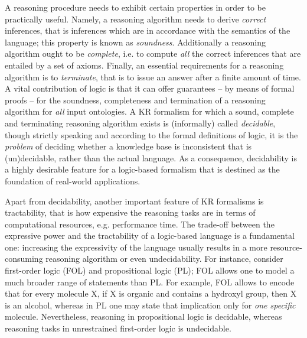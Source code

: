 \documentclass[10pt]{bmc_article}
\newenvironment{bmcformat}{\baselineskip20pt\sloppy\setboolean{publ}{false}}{\baselineskip20pt\sloppy}
\begin{document}
\begin{bmcformat}
A reasoning procedure needs to exhibit certain properties in order to be practically useful. Namely, a reasoning algorithm needs to derive \emph{correct} inferences, that is inferences which are in accordance with the semantics of the language; this property is known as \emph{soundness}. Additionally a reasoning algorithm ought to be \emph{complete}, i.e. to compute \emph{all} the correct inferences that are entailed by a set of axioms. Finally, an essential requirements for a reasoning algorithm is to \emph{terminate}, that is to issue an answer after a finite amount of time. A vital contribution of logic is that it can offer guarantees -- by means of formal proofs -- for the soundness, completeness and termination of a reasoning algorithm for \emph{all} input ontologies. A KR formalism for which a sound, complete and terminating reasoning algorithm exists is (informally) called \emph{decidable}, though strictly speaking and according to the formal definitions of logic, it is the \emph{problem} of deciding whether a knowledge base is inconsistent that is (un)decidable, rather than the actual language. As a consequence, decidability is a highly desirable feature for a logic-based formalism that is destined as the foundation of real-world applications.

Apart from decidability, another important feature of KR formalisms is tractability, that is how expensive the reasoning tasks are in terms of computational resources, e.g. performance time. The trade-off between the expressive power and the tractability of a logic-based language is a fundamental one: increasing the expressivity of the language usually results in a more resource-consuming reasoning algorithm or even undecidability. For instance, consider first-order logic (FOL) and propositional logic (PL); FOL allows one to model a much broader range of statements than PL. For example, FOL allows to encode that for every molecule X, if X is organic and contains a hydroxyl group, then X is an alcohol, whereas in PL one may state that implication only for \emph{one specific} molecule. Nevertheless, reasoning in propositional logic is decidable, whereas reasoning tasks in unrestrained first-order logic is undecidable.


\end{bmcformat}
\end{document}
